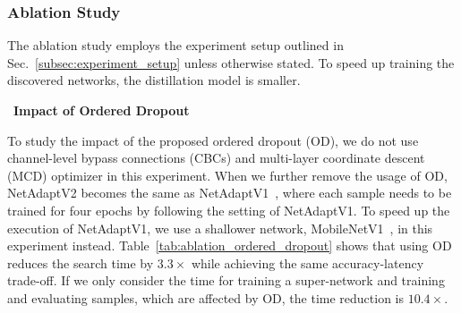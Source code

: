 \subsubsection{Ablation Study}
\label{subsubsec:ablation_study}

The ablation study employs the experiment setup outlined in Sec.~\ref{subsec:experiment_setup} unless otherwise stated. To speed up training the discovered networks, the distillation model is smaller.

\noindent \textbullet\ \textbf{Impact of Ordered Dropout}

To study the impact of the proposed ordered dropout (OD), we do not use channel-level bypass connections (CBCs) and multi-layer coordinate descent (MCD) optimizer in this experiment. When we further remove the usage of OD, NetAdaptV2 becomes the same as NetAdaptV1~\cite{eccv2018-netadapt}, where each sample needs to be trained for four epochs by following the setting of NetAdaptV1. To speed up the execution of NetAdaptV1, we use a shallower network, MobileNetV1~\cite{Howard2017MobileNetV1}, in this experiment instead. Table~\ref{tab:ablation_ordered_dropout} shows that using OD reduces the search time by $3.3\times$ while achieving the same accuracy-latency trade-off. If we only consider the time for training a super-network and training and evaluating samples, which are affected by OD, the time reduction is $10.4\times$.


